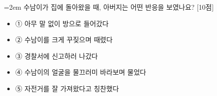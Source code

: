 \documentclass[12pt,a4paper]{article}
\newcommand{\qnum}[1]{%
  \tikz[baseline=(num.base)]{%
    \node[circle, fill=numCircle, text=white, inner sep=0pt,
          minimum size=18pt, font=\small\bfseries] (num) {#1};%
  }%
}
\newcommand{\pts}[1]{%
  \hfill\textcolor{ptsBadge}{[#1점]}%
}
\begin{document}
\vspace{4mm}
\begin{minipage}{\columnwidth}
{\hangindent=2em
\qnum{8}\enspace 수남이가 집에 돌아왔을 때, 아버지는 어떤 반응을 보였나요? \pts{10}
\par}

\vspace{3mm}
\begin{itemize}[leftmargin=2.5em, labelsep=0.3em, label={}, itemsep=4pt, parsep=1pt, topsep=0pt]
  \item ① 아무 말 없이 방으로 들어갔다
  \item ② 수남이를 크게 꾸짖으며 때렸다
  \item ③ 경찰서에 신고하러 나갔다
  \item ④ 수남이의 얼굴을 물끄러미 바라보며 물었다
  \item ⑤ 자전거를 잘 가져왔다고 칭찬했다
\end{itemize}
\end{minipage}
\vspace{4mm}
\end{document}
